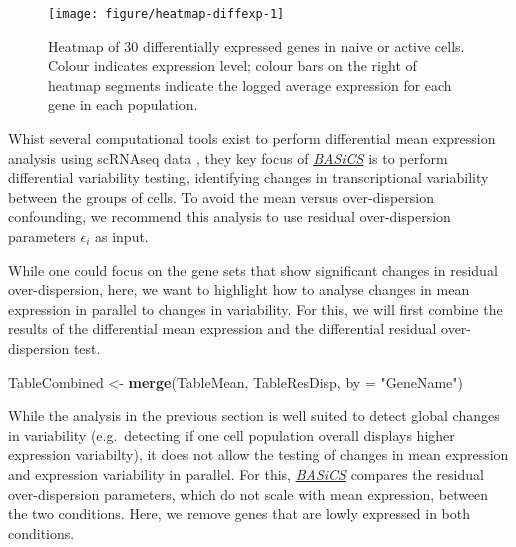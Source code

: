 \documentclass[9pt,a4paper,]{extarticle}
\newenvironment{Shaded}{\begin{snugshade}}{\end{snugshade}}
\newcommand{\CommentTok}[1]{\textcolor[rgb]{0.56,0.35,0.01}{\textit{#1}}}
\newcommand{\DataTypeTok}[1]{\textcolor[rgb]{0.13,0.29,0.53}{#1}}
\newcommand{\DecValTok}[1]{\textcolor[rgb]{0.00,0.00,0.81}{#1}}
\newcommand{\KeywordTok}[1]{\textcolor[rgb]{0.13,0.29,0.53}{\textbf{#1}}}
\newcommand{\NormalTok}[1]{#1}
\newcommand{\OperatorTok}[1]{\textcolor[rgb]{0.81,0.36,0.00}{\textbf{#1}}}
\newcommand{\StringTok}[1]{\textcolor[rgb]{0.31,0.60,0.02}{#1}}
\begin{document}
\begin{figure}

{\centering \texttt{[image: figure/heatmap-diffexp-1]} 

}

\caption{Heatmap of 30 differentially expressed genes in naive or active cells. Colour indicates expression level; colour bars on the right of heatmap segments indicate the logged average expression for each gene in each population.}\label{fig:heatmap-diffexp}
\end{figure}

Whist several computational tools exist to perform differential mean expression
analysis using scRNAseq data \citep{Soneson2018}, they key focus of
\emph{\href{https://bioconductor.org/packages/3.11/BASiCS}{BASiCS}} is to perform differential variability testing,
identifying changes in transcriptional variability between the groups of cells.
To avoid the mean versus over-dispersion confounding, we recommend this analysis
to use residual over-dispersion parameters \(\epsilon_i\) as input.

While one could focus on the gene sets that show significant changes in
residual over-dispersion, here, we want to highlight how to analyse
changes in mean expression in parallel to changes in variability.
For this, we will first combine the results of the differential mean expression
and the differential residual over-dispersion test.

\begin{Shaded}
\begin{Highlighting}[]
\NormalTok{TableCombined <-}\StringTok{ }\KeywordTok{merge}\NormalTok{(TableMean, TableResDisp, }\DataTypeTok{by =} \StringTok{"GeneName"}\NormalTok{)}
\end{Highlighting}
\end{Shaded}

While the analysis in the previous section is well suited to detect global
changes in variability (e.g.~detecting if one cell population overall displays
higher expression variabilty), it does not allow the testing of changes in
mean expression and expression variability in parallel.
For this, \emph{\href{https://bioconductor.org/packages/3.11/BASiCS}{BASiCS}} compares the residual over-dispersion
parameters, which do not scale with mean expression, between the two conditions.
Here, we remove genes that are lowly expressed in both conditions.

\begin{Shaded}
\end{Shaded}
\end{document}
